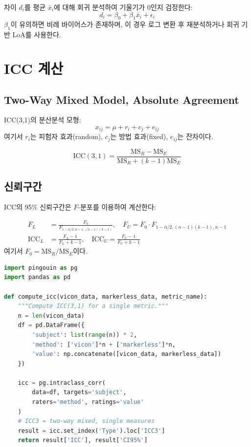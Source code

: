 \documentclass[11pt, a4paper]{report}
\begin{document}
차이 $d_i$를 평균 $\bar{x}_i$에 대해 회귀 분석하여 기울기가 0인지 검정한다:
\begin{equation}
  d_i = \beta_0 + \beta_1 \bar{x}_i + \epsilon_i
\end{equation}
$\beta_1$이 유의하면 비례 바이어스가 존재하며, 이 경우 로그 변환 후 재분석하거나
회귀 기반 LoA를 사용한다.

\section{ICC 계산}

\subsection{Two-Way Mixed Model, Absolute Agreement}

ICC(3,1)의 분산분석 모형:
\begin{equation}
  x_{ij} = \mu + r_i + c_j + e_{ij}
\end{equation}
여기서 $r_i$는 피험자 효과(random), $c_j$는 방법 효과(fixed), $e_{ij}$는 잔차이다.

\begin{equation}
  \text{ICC}(3,1) = \frac{\text{MS}_R - \text{MS}_E}{\text{MS}_R + (k-1)\text{MS}_E}
\end{equation}

\subsection{신뢰구간}

ICC의 95\% 신뢰구간은 $F$-분포를 이용하여 계산한다:

\begin{equation}
\begin{aligned}
  F_L &= \frac{F_0}{F_{1-\alpha/2, n-1, (n-1)(k-1)}}, \quad
  F_U = F_0 \cdot F_{1-\alpha/2, (n-1)(k-1), n-1} \\
  \text{ICC}_L &= \frac{F_L - 1}{F_L + k - 1}, \quad
  \text{ICC}_U = \frac{F_U - 1}{F_U + k - 1}
\end{aligned}
\end{equation}
여기서 $F_0 = \text{MS}_R / \text{MS}_E$이다.

\begin{codebox}[title={ICC 계산 구현}]
\begin{lstlisting}[language=Python]
import pingouin as pg
import pandas as pd

def compute_icc(vicon_data, markerless_data, metric_name):
    """Compute ICC(3,1) for a single metric."""
    n = len(vicon_data)
    df = pd.DataFrame({
        'subject': list(range(n)) * 2,
        'method': ['vicon']*n + ['markerless']*n,
        'value': np.concatenate([vicon_data, markerless_data])
    })

    icc = pg.intraclass_corr(
        data=df, targets='subject',
        raters='method', ratings='value'
    )
    # ICC3 = two-way mixed, single measures
    result = icc.set_index('Type').loc['ICC3']
    return result['ICC'], result['CI95%']
\end{lstlisting}
\end{codebox}
\end{document}
